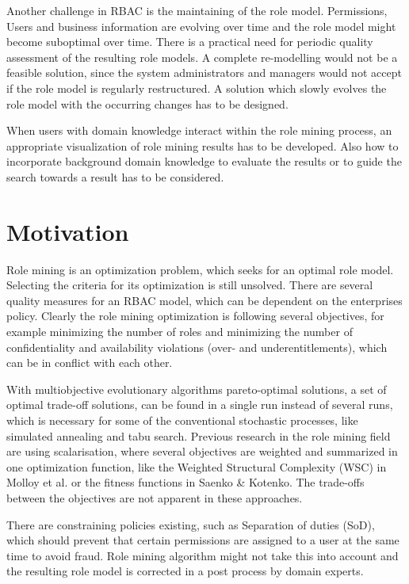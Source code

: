 Another challenge in RBAC is the maintaining of the role model. Permissions, Users and business information are evolving over time and the role model might become suboptimal over time. There is a practical need for periodic quality assessment of the resulting role models\cite{Kunz}. A complete re-modelling would not be a feasible solution, since the system administrators and managers would not accept if the role model is regularly restructured. A solution which slowly evolves the role model with the occurring changes has to be designed.

When users with domain knowledge interact within the role mining process, an appropriate visualization of role mining results has to be developed. Also how to incorporate background domain knowledge to evaluate the results or to guide the search towards a result has to be considered\cite{Han}.
\fi


\section{Motivation}
Role mining is an optimization problem, which seeks for an optimal role model. Selecting the criteria for its optimization is still unsolved. There are several quality measures for an RBAC model, which can be dependent on the enterprises policy. Clearly the role mining optimization is following several objectives, for example minimizing the number of roles and minimizing the number of confidentiality and availability violations (over- and underentitlements), which can be in conflict with each other.

With multiobjective evolutionary algorithms pareto-optimal solutions, a set of optimal trade-off solutions, can be found in a single run instead of several runs, which is necessary for some of the conventional stochastic processes, like simulated annealing and tabu search\cite{abraham2005evolutionary}. Previous research in the role mining field are using scalarisation, where several objectives are weighted and summarized in one optimization function, like the Weighted Structural Complexity (WSC) in Molloy et al.\cite{Molloy} or the fitness functions in Saenko \& Kotenko\cite{saenko2012design}. The trade-offs between the objectives are not apparent in these approaches.

There are constraining policies existing, such as Separation of duties (SoD), which should prevent that certain permissions are assigned to a user at the same time to avoid fraud. Role mining algorithm might not take this into account and the resulting role model is corrected in a post process by domain experts.

